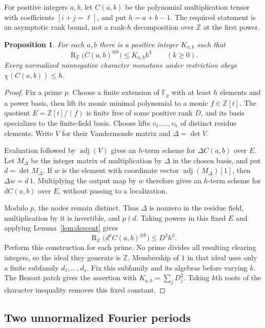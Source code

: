 \documentclass[11pt]{article}
\newtheorem{proposition}[theorem]{Proposition}
\theoremstyle{remark}
\DeclareMathOperator{\rk}{R}
\newcommand{\Z}{\mathbb Z}
\newcommand{\F}{\mathbb F}
\newcommand{\tp}[1]{^{\otimes #1}}
\numberwithin{equation}{section}
\begin{document}
For positive integers $a,b$, let $C(a,b)$ be the polynomial multiplication tensor with coefficients
$[i+j=\ell]$, and put $h=a+b-1$. The required statement is an asymptotic
rank bound, not a rank-$h$ decomposition over $\Z$ at the first power.

\begin{proposition}\label{prop:convolution}
For each $a,b$ there is a positive integer $K_{a,b}$ such that
\[
 \rk_\Z\bigl(C(a,b)\tp{k}\bigr)\leq K_{a,b}h^k
 \qquad(k\geq0).
\]
Every normalized nonnegative character monotone under restriction obeys
$\chi(C(a,b))\leq h$.
\end{proposition}

\begin{proof}
Fix a prime $p$. Choose a finite extension of $\F_p$ with at least $h$
elements and a power basis, then lift its monic minimal polynomial to a
monic $f\in\Z[t]$. The quotient $E=\Z[t]/(f)$ is finite free of some
positive rank $D$, and its basis specializes to the finite-field basis.
Choose lifts $v_1,\ldots,v_h$ of distinct residue elements. Write $V$ for
their Vandermonde matrix and $\Delta=\det V$.

Evaluation followed by $\operatorname{adj}(V)$ gives an $h$-term scheme
for $\Delta C(a,b)$ over $E$. Let $M_\Delta$ be the integer matrix of
multiplication by $\Delta$ in the chosen basis, and put $d=\det M_\Delta$.
If $w$ is the element with coordinate vector
$\operatorname{adj}(M_\Delta)[1]$, then $\Delta w=d\,1$.
Multiplying the output map by $w$ therefore gives an $h$-term scheme
for $dC(a,b)$ over $E$, without passing to a localization.

Modulo $p$, the nodes remain distinct. Thus $\Delta$ is nonzero in the
residue field, multiplication by it is invertible, and $p\nmid d$.
Taking powers in this fixed $E$ and applying
Lemma~\ref{lem:descent} gives
\[
 \rk_\Z\bigl(d^k C(a,b)\tp{k}\bigr)\leq D^2h^k.
\]
Perform this construction for each prime. No prime divides all resulting
clearing integers, so the ideal they generate is $\Z$. Membership of $1$
in that ideal uses only a finite subfamily $d_1,\ldots,d_s$.
Fix this subfamily and its algebras before varying $k$. The Bezout patch
gives the assertion with $K_{a,b}=\sum_jD_j^2$. Taking $k$th roots of
the character inequality removes this fixed constant.
\end{proof}

\subsection{Two unnormalized Fourier periods}
\end{document}
